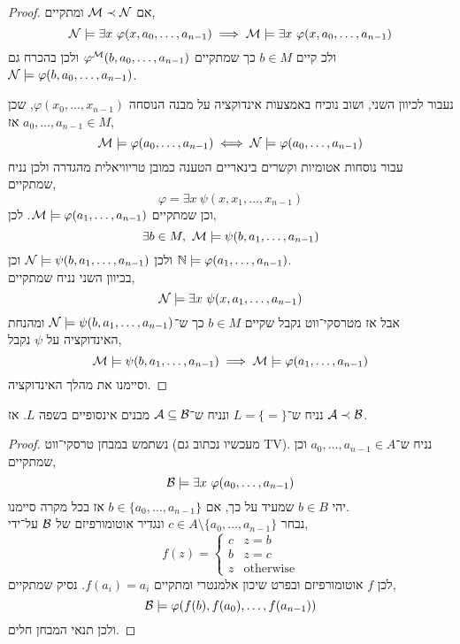 \begin{proof}
	אם $\mathcal{M} \prec \mathcal{N}$ ומתקיים,
	\[
		\mathcal{N} \models \exists x\ \varphi(x, a_0, \ldots, a_{n - 1})
		\implies \mathcal{M} \models \exists x\ \varphi(x, a_0, \ldots, a_{n - 1})
	\]
	ולכ קיים $b \in M$ כך שמתקיים $\varphi^{\mathcal{M}}(b, a_0, \ldots, a_{n - 1})$ ולכן בהכרח גם $\mathcal{N} \models \varphi(b, a_0, \ldots, a_{n - 1})$.

	נעבור לכיוון השני, ושוב נוכיח באמצעות אינדוקציה על מבנה הנוסחה $\varphi(x_0, \ldots, x_{n - 1})$, שכן $a_0, \ldots, a_{n - 1} \in M$ אז,
	\[
		\mathcal{M} \models \varphi(a_0, \ldots, a_{n - 1})
		\iff \mathcal{N} \models \varphi(a_0, \ldots, a_{n - 1})
	\]
	עבור נוסחות אטומיות וקשרים בינאריים הטענה כמובן טריוויאלית מהגדרה ולכן נניח שמתקיים,
	\[
		\varphi = \exists x\ \psi(x, x_1, \ldots, x_{n - 1})
	\]
	וכן שמתקיים $\mathcal{M} \models \varphi(a_1, \ldots, a_{n - 1})$.
	לכן,
	\[
		\exists b \in M,\ \Mm \models \psi(b, a_1, \ldots, a_{n - 1})
	\]
	ולכן $\mathcal{N} \models \psi(b, a_1, \ldots, a_{n - 1})$ וכן $\mathbb{N} \models \varphi(a_1, \ldots, a_{n - 1})$. \\
	בכיוון השני נניח שמתקיים,
	\[
		\mathcal{N} \models \exists x\ \psi(x, a_1, \ldots, a_{n - 1})
	\]
	אבל אז מטרסקי־ווט נקבל שקיים $b \in M$ כך ש־$\mathcal{N} \models \psi(b, a_1, \ldots, a_{n - 1})$ ומהנחת האינדוקציה על $\psi$ נקבל,
	\[
		\mathcal{M} \models \psi(b, a_1, \ldots, a_{n - 1})
		\implies \mathcal{M} \models \varphi(a_1, \ldots, a_{n - 1})
	\]
	וסיימנו את מהלך האינדוקציה.
\end{proof}
\begin{corollary}
	נניח ש־$L = \{ = \}$ ונניח ש־$\mathcal{A} \subseteq \mathcal{B}$ מבנים אינסופיים בשפה $L$.
	אז $\mathcal{A} \prec \mathcal{B}$.
\end{corollary}
\begin{proof}
	נשתמש במבחן טרסקי־ווט (מעכשיו נכתוב גם TV).
	נניח ש־$a_0, \ldots, a_{n - 1} \in A$ וכן שמתקיים,
	\[
		\Bb \models \exists x\ \varphi(a_0, \ldots, a_{n - 1})
	\]
	יהי $b \in B$ שמעיד על כך, אם $b \in \{ a_0, \ldots, a_{n - 1} \}$ אז בכל מקרה סיימנו. \\
	נבחר $c \in A \setminus \{ a_0, \ldots, a_{n - 1} \}$ ונגדיר אוטומורפיזם של $\mathcal{B}$ על־ידי,
	\[
		f(z)
		= \begin{cases}
			c & z = b \\
			b & z = c \\
			z & \text{otherwise}
		\end{cases}
	\]
	לכן $f$ אוטומורפיזם ובפרט שיכון אלמנטרי ומתקיים $f(a_i) = a_i$.
	נסיק שמתקיים,
	\[
		\mathcal{B} \models \varphi(f(b), f(a_0), \ldots, f(a_{n - 1}))
	\]
	ולכן תנאי המבחן חלים.
\end{proof}
